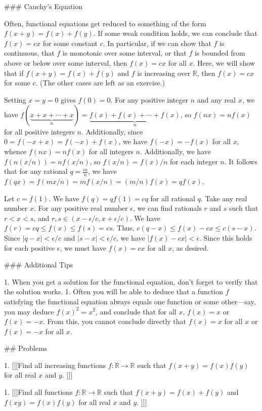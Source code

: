 ### Cauchy's Equation

Often, functional equations get reduced to something of the form $f(x+y) = f(x) + f(y)$. If some weak condition holds, we can conclude that $f(x) = cx$ for some constant $c$. In particular, if we can show that $f$ is continuous, that $f$ is monotonic over some interval, or that $f$ is bounded from above or below over some interval, then $f(x) = cx$ for all $x$. Here, we will show that if $f(x+y) = f(x) + f(y)$ and $f$ is increasing over $\mathbb{R}$, then $f(x) = cx$ for some $c$. (The other cases are left as an exercise.)

Setting $x=y=0$ gives $f(0) = 0$. For any positive integer $n$ and any real $x$, we have $f(\underbrace{x + x + \cdots + x}_n) = \underbrace{f(x) + f(x) + \cdots + f(x)}_n$, so $f(nx) = nf(x)$ for all positive integers $n$. Additionally, since $0 = f(-x + x) = f(-x) + f(x)$, we have $f(-x) = -f(x)$ for all $x$, whence $f(nx) = nf(x)$ for all integers $n$. Additionally, we have $f(n(x/n)) = n f(x/n)$, so $f(x/n) = f(x)/n$ for each integer $n$. It follows that for any rational $q = \frac{m}{n}$, we have $f(qx) = f(mx/n) = mf(x/n) = (m/n)f(x) = qf(x)$. 

Let $c = f(1)$. We have $f(q) = qf(1) = cq$ for all rational $q$. Take any real number $x$. For any positive real number $\epsilon$, we can find rationals $r$ and $s$ such that $r < x < s$, and $r,s \in (x - \epsilon/c, x + \epsilon/c)$. We have $f(r) = cq \leq f(x) \leq f(s) = cs$. Thus, $c(q - x) \leq f(x) - cx \leq c(s - x)$. Since $|q-x| < \epsilon/c$ and $|s - x| < \epsilon/c$, we have $|f(x) - cx| < \epsilon$. Since this holds for each positive $\epsilon$, we must have $f(x) = cx$ for all $x$, as desired. 

### Additional Tips

1.  When you get a solution for the functional equation, don't forget to verify that the solution works. 
1.  Often you will be able to deduce that a function $f$ satisfying the functional equation always equals one function or some other---say, you may deduce $f(x)^2 = x^2$, and conclude that for all $x$, $f(x) = x$ or $f(x) = -x$. From this, you cannot conclude directly that $f(x) = x$ for all $x$ or $f(x) = -x$ for all $x$. 

## Problems

1.  [[[Find all increasing functions $f : \mathbb{R} \to \mathbb{R}$ such that $f(x+y) = f(x)f(y)$ for all real $x$ and $y$. ]]]
  
1. [[[Find all functions $f : \mathbb{R} \to \mathbb{R}$ such that $f(x+y) = f(x) + f(y)$ and $f(xy) = f(x)f(y)$ for all real $x$ and $y$. ]]]
  
